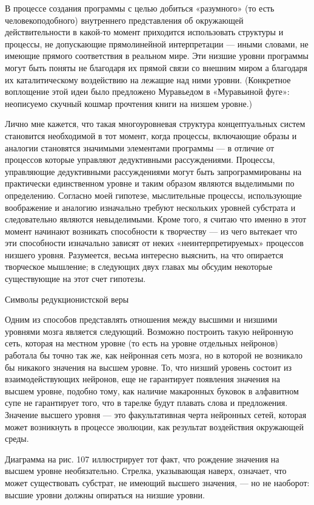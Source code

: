 \documentclass[../main.tex]{subfiles}
\begin{document}
В процессе создания программы с целью добиться «разумного» (то есть человекоподобного) внутреннего представления об окружающей действительности в какой-то момент приходится использовать структуры и процессы, не допускающие прямолинейной интерпретации --- иными словами, не имеющие прямого соответствия в реальном мире. Эти низшие уровни программы могут быть поняты не благодаря их прямой связи со внешним миром а благодаря их каталитическому воздействию на лежащие над ними уровни. (Конкретное воплощение этой идеи было предложено Муравьедом в «Муравьиной фуге»: неописуемо скучный кошмар прочтения книги на низшем уровне.)

Лично мне кажется, что такая многоуровневая структура концептуальных систем становится необходимой в тот момент, когда процессы, включающие образы и аналогии становятся значимыми элементами программы --- в отличие от процессов которые управляют дедуктивными рассуждениями. Процессы, управляющие дедуктивными рассуждениями могут быть запрограммированы на практически единственном уровне и таким образом являются выделимыми по определению. Согласно моей гипотезе, мыслительные процессы, использующие воображение и аналогию изначально требуют нескольких уровней субстрата и следовательно являются невыделимыми. Кроме того, я считаю что именно в этот момент начинают возникать способности к творчеству --- из чего вытекает что эти способности изначально зависят от неких «неинтерпретируемых» процессов низшего уровня. Разумеется, весьма интересно выяснить, на что опирается творческое мышление; в следующих двух главах мы обсудим некоторые существующие на этот счет гипотезы.

Символы редукционистской веры

Одним из способов представлять отношения между высшими и низшими уровнями мозга является следующий. Возможно построить такую нейронную сеть, которая на местном уровне (то есть на уровне отдельных нейронов) работала бы точно так же, как нейронная сеть мозга, но в которой не возникало бы никакого значения на высшем уровне. То, что низший уровень состоит из взаимодействующих нейронов, еще не гарантирует появления значения на высшем уровне, подобно тому, как наличие макаронных буковок в алфавитном супе не гарантирует того, что в тарелке будут плавать слова и предложения. Значение высшего уровня --- это факультативная черта нейронных сетей, которая может возникнуть в процессе эволюции, как результат воздействия окружающей среды.

Диаграмма на рис. 107 иллюстрирует тот факт, что рождение значения на высшем уровне необязательно. Стрелка, указывающая наверх, означает, что может существовать субстрат, не имеющий высшего значения, --- но не наоборот: высшие уровни должны опираться на низшие уровни.
\end{document}
